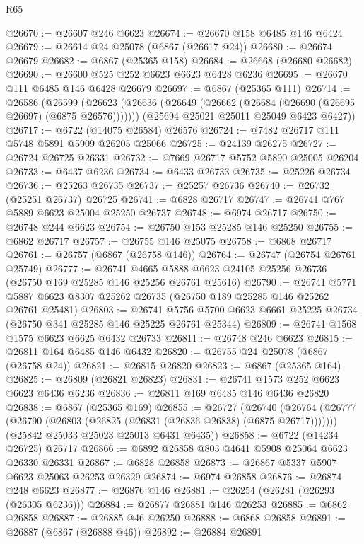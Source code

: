 \begin{lexlean}{R65}
\begin{coremodule}
{@26670 := @26607 @246 @6623
@26674 := @26670 @158 @6485 @146 @6424
@26679 := @26614 @24 @25078 (@6867 (@26617 @24))
@26680 := @26674 @26679
@26682 := @6867 (@25365 @158)
@26684 := @26668 (@26680 @26682)
@26690 := @26600 @525 @252 @6623 @6623 @6428 @6236
@26695 := @26670 @111 @6485 @146 @6428 @26679
@26697 := @6867 (@25365 @111)
@26714 := @26586
    (@26599
      (@26623 (@26636 (@26649 (@26662 (@26684 (@26690 (@26695 @26697) (@6875 @26576)))))))
      (@25694 @25021 @25011 @25049 @6423 @6427))
@26717 := @6722 (@14075 @26584) @26576
@26724 := @7482 @26717 @111 @5748 @5891 @5909 @26205 @25066
@26725 := @24139 @26275
@26727 := @26724 @26725 @26331
@26732 := @7669 @26717 @5752 @5890 @25005 @26204
@26733 := @6437 @6236
@26734 := @6433 @26733
@26735 := @25226 @26734
@26736 := @25263 @26735
@26737 := @25257 @26736
@26740 := @26732 (@25251 @26737) @26725
@26741 := @6828 @26717
@26747 := @26741 @767 @5889 @6623 @25004 @25250 @26737
@26748 := @6974 @26717
@26750 := @26748 @244 @6623
@26754 := @26750 @153 @25285 @146 @25250
@26755 := @6862 @26717
@26757 := @26755 @146 @25075
@26758 := @6868 @26717
@26761 := @26757 (@6867 (@26758 @146))
@26764 := @26747 (@26754 @26761 @25749)
@26777 := @26741
    @4665
    @5888
    @6623
    @24105
    @25256
    @26736
    (@26750 @169 @25285 @146 @25256 @26761 @25616)
@26790 := @26741
    @5771
    @5887
    @6623
    @8307
    @25262
    @26735
    (@26750 @189 @25285 @146 @25262 @26761 @25481)
@26803 := @26741
    @5756
    @5700
    @6623
    @6661
    @25225
    @26734
    (@26750 @341 @25285 @146 @25225 @26761 @25344)
@26809 := @26741 @1568 @1575 @6623 @6625 @6432 @26733
@26811 := @26748 @246 @6623
@26815 := @26811 @164 @6485 @146 @6432
@26820 := @26755 @24 @25078 (@6867 (@26758 @24))
@26821 := @26815 @26820
@26823 := @6867 (@25365 @164)
@26825 := @26809 (@26821 @26823)
@26831 := @26741 @1573 @252 @6623 @6623 @6436 @6236
@26836 := @26811 @169 @6485 @146 @6436 @26820
@26838 := @6867 (@25365 @169)
@26855 := @26727
    (@26740
      (@26764 (@26777 (@26790 (@26803 (@26825 (@26831 (@26836 @26838) (@6875 @26717)))))))
      (@25842 @25033 @25023 @25013 @6431 @6435))
@26858 := @6722 (@14234 @26725) @26717
@26866 := @6892 @26858 @803 @4641 @5908 @25064 @6623 @26330 @26331
@26867 := @6828 @26858
@26873 := @26867 @5337 @5907 @6623 @25063 @26253 @26329
@26874 := @6974 @26858
@26876 := @26874 @248 @6623
@26877 := @26876 @146
@26881 := @26254 (@26281 (@26293 (@26305 @6236)))
@26884 := @26877 @26881 @146 @26253
@26885 := @6862 @26858
@26887 := @26885 @46 @26250
@26888 := @6868 @26858
@26891 := @26887 (@6867 (@26888 @46))
@26892 := @26884 @26891
}
\end{coremodule}
\end{lexlean}
